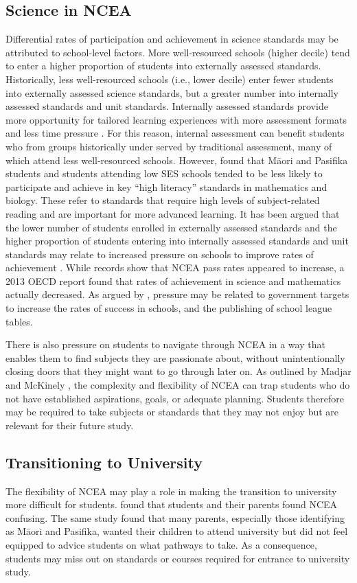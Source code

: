 \documentclass[a4paper,man,natbib]{apa6}
\begin{document}
\subsection{Science in NCEA}
Differential rates of participation and achievement in science standards may be attributed to school-level factors. More well-resourced schools (higher decile) tend to enter a higher proportion of students into externally assessed standards. Historically, less well-resourced schools (i.e., lower decile) enter fewer students into externally assessed science standards, but a greater number into internally assessed standards and unit standards. Internally assessed standards provide more opportunity for tailored learning experiences with more assessment formats and less time pressure \cite{hipkins}. For this reason, internal assessment can benefit students who from groups historically under served by traditional assessment, many of which attend less well-resourced schools. However, \cite{wilson2017subject} found that M\={a}ori and Pasifika students and students attending low SES schools tended to be less likely to participate and achieve in key ``high literacy'' standards in mathematics and biology. These refer to standards that require high levels of subject-related reading and are important for more advanced learning. It has been argued that the lower number of students enrolled in externally assessed standards and the higher proportion of students entering into internally assessed standards and unit standards may relate to increased pressure on schools to improve rates of achievement \cite{hipkins,wilson2017subject}. While records show that NCEA pass rates appeared to increase, a 2013 OECD report found that rates of achievement in science and mathematics actually decreased. As argued by \cite{wilson2017subject}, pressure may be related to government targets to increase the rates of success in schools, and the publishing of school league tables. 

There is also pressure on students to navigate through NCEA in a way that enables them to find subjects they are passionate about, without unintentionally closing doors that they might want to go through later on. As outlined by Madjar and McKinely \cite{authority2013understanding}, the complexity and flexibility of NCEA can trap students who do not have established aspirations, goals, or adequate planning. Students therefore may be required to take subjects or standards that they may not enjoy but are relevant for their future study.  

\subsection{Transitioning to University}
The flexibility of NCEA may play a role in making the transition to university more difficult for students. \cite{jensen2010ncea} found that students and their parents found NCEA confusing. The same study found that many parents, especially those identifying as M\={a}ori and Pasifika, wanted their children to attend university but did not feel equipped to advice students on what pathways to take. As a consequence, students may miss out on standards or courses required for entrance to university study. 
\end{document}
